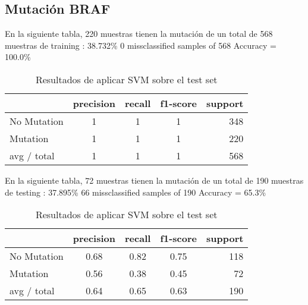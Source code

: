 \documentclass[11pt,spanish,listoffigures,listoftables]{tfgetsinf}
\begin{document}
\begin{table}[h]

\subsection{Mutaci\'on BRAF}
En la siguiente tabla, 220 muestras tienen la mutaci\'on de un total de 568 muestras de training : 38.732\% 
      0 missclassified samples of 568 Accuracy = 100.0\%

\caption{Resultados de aplicar SVM sobre el trainning set }
\begin{tabular}{l*{3}{c}r}
              & precision   & recall  &f1-score   &support\\
\hline
No Mutation & 1 & 1 & 1 &  348\\
Mutation & 1 & 1 & 1 &  220\\
\hline
avg / total & 1 & 1 & 1 &  568\\
\end{tabular}
\newline
\newline
\newline
En la siguiente tabla, 72 muestras tienen la mutaci\'on de un total de 190 muestras de testing : 37.895\% 
      66 missclassified samples of 190 Accuracy = 65.3\%


\caption{Resultados de aplicar SVM sobre el test set}
\begin{tabular}{l*{3}{c}r}
              & precision   & recall  &f1-score   &support\\
\hline
No Mutation &  0.68 & 0.82 & 0.75&  118\\
Mutation &  0.56 & 0.38 & 0.45 &  72\\
\hline
avg / total & 0.64 & 0.65 & 0.63 &  190\\
\end{tabular}
\end{table}
\clearpage
\end{document}

